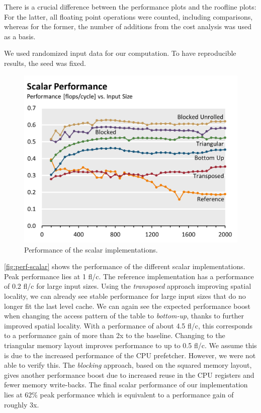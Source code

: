 There is a crucial difference between the performance plots and the roofline
plots: For the latter, all floating point operations were counted, including
comparisons, whereas for the former, the number of additions from the cost
analysis was used as a basis.

We used randomized input data for our computation. To have reproducible
results, the seed was fixed.

\begin{figure}\centering
  \includegraphics[width=\linewidth]{plot_data/scalar_performance.png}
  \caption{Performance of the scalar implementations.}
  \label{fig:perf-scalar}
\end{figure}
\autoref{fig:perf-scalar} shows the performance of the different scalar
implementations. Peak performance lies at 1 fl/c. The reference
implementation has a performance of 0.2 fl/c for large input sizes. Using
the \emph{transposed} approach improving spatial locality, we can already
see stable performance for large input sizes that do no longer fit the last
level cache. We can again see the expected performance boost when changing
the access pattern of the table to \emph{bottom-up}, thanks to further
improved spatial locality. With a performance of about 4.5 fl/c, this
corresponds to a performance gain of more than 2x to the baseline. Changing
to the triangular memory layout improves performance to up to 0.5 fl/c. We
assume this is due to the increased performance of the CPU prefetcher.
However, we were not able to verify this. The \emph{blocking} approach,
based on the squared memory layout, gives another performance boost due to
increased reuse in the CPU registers and fewer memory write-backs. The
final scalar performance of our implementation lies at 62\% peak
performance which is equivalent to a performance gain of roughly 3x.

